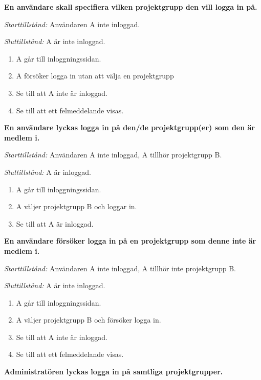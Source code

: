 \documentclass[a4paper]{article}
\begin{document}
\begin{FT}
\item
\textbf{En användare skall specifiera vilken projektgrupp den vill logga in på.}

\emph{Starttillstånd:} Användaren A inte inloggad.

\emph{Sluttillstånd:} A är inte inloggad.

\begin{enumerate}
\item A går till inloggningssidan.
\item A försöker logga in utan att välja en projektgrupp
\item Se till att A inte är inloggad.
\item Se till att ett felmeddelande visas.
\end{enumerate}

\item
\textbf{En användare lyckas logga in på den/de projektgrupp(er) som den är medlem i.}

\emph{Starttillstånd:} Användaren A inte inloggad, A tillhör projektgrupp B.

\emph{Sluttillstånd:} A är inloggad.

\begin{enumerate}
\item A går till inloggningssidan.
\item A väljer projektgrupp B och loggar in.
\item Se till att A är inloggad.
\end{enumerate}

\item
\textbf{En användare försöker logga in på en projektgrupp som denne inte är medlem i.}

\emph{Starttillstånd:} Användaren A inte inloggad, A tillhör inte projektgrupp B.

\emph{Sluttillstånd:} A är inte inloggad.

\begin{enumerate}
\item A går till inloggningssidan.
\item A väljer projektgrupp B och försöker logga in.
\item Se till att A inte är inloggad.
\item Se till att ett felmeddelande visas.
\end{enumerate}

\item
\textbf{Administratören lyckas logga in på samtliga projektgrupper.}


\end{FT}
\end{document}
